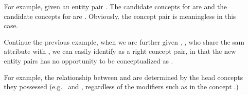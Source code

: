 \begin{example}
For example, given an entity pair . The candidate concepts for  are  and the candidate concepts for  are . Obviously, the concept pair  is meaningless in this case.
\label{exa:jc}
\end{example}


\begin{example}
Continue the previous example, when we are further given , , who share the sam attribute  with , we can easily identify  as a right concept pair, in that the new entity pairs has no opportunity to be conceptualized as .
\label{exa:sd}
\end{example}

\begin{example}
For example, the  relationship between  and  are determined by the head concepts they possessed (e.g.\  and , regardless of the modifiers such as  in the concept .)
\label{exa:hc}
\end{example}






